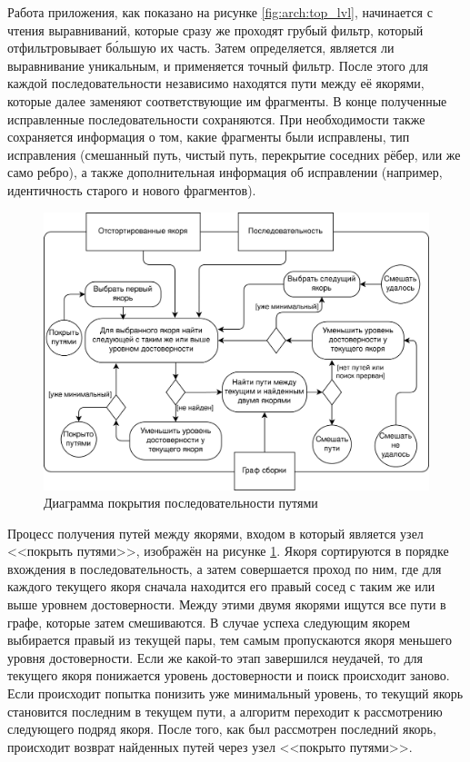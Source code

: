 \documentclass[14pt]{matmex-diploma-custom}
\begin{document}
Работа приложения, как показано на рисунке \ref{fig:arch:top_lvl}, начинается с чтения выравниваний, которые сразу же проходят грубый фильтр, который отфильтровывает б\'{о}льшую их часть. Затем определяется, является ли выравнивание уникальным, и применяется точный фильтр. После этого для каждой последовательности независимо находятся пути между её якорями, которые далее заменяют соответствующие им фрагменты. В конце полученные исправленные последовательности сохраняются. При необходимости также сохраняется информация о том, какие фрагменты были исправлены, тип исправления (смешанный путь, чистый путь, перекрытие соседних рёбер, или же само ребро), а также дополнительная информация об исправлении (например, идентичность старого и нового фрагментов). 

\begin{figure}[h]
    \centering
    \includegraphics{NIR_arch-Page-2.png}
    \caption{Диаграмма покрытия последовательности путями}
    \label{fig:arch:cover}
\end{figure}

Процесс получения путей между якорями, входом в который является узел <<покрыть путями>>, изображён на рисунке \ref{fig:arch:cover}. Якоря сортируются в порядке вхождения в последовательность, а затем совершается проход по ним, где для каждого текущего якоря сначала находится его правый сосед с таким же или выше уровнем достоверности. Между этими двумя якорями ищутся все пути в графе, которые затем смешиваются. В случае успеха следующим якорем выбирается правый из текущей пары, тем самым пропускаются якоря меньшего уровня достоверности. Если же какой-то этап завершился неудачей, то для текущего якоря понижается уровень достоверности и поиск происходит заново. Если происходит попытка понизить уже минимальный уровень, то текущий якорь становится последним в текущем пути, а алгоритм переходит к рассмотрению следующего подряд якоря. После того, как был рассмотрен последний якорь, происходит возврат найденных путей через узел <<покрыто путями>>.
\end{document}
